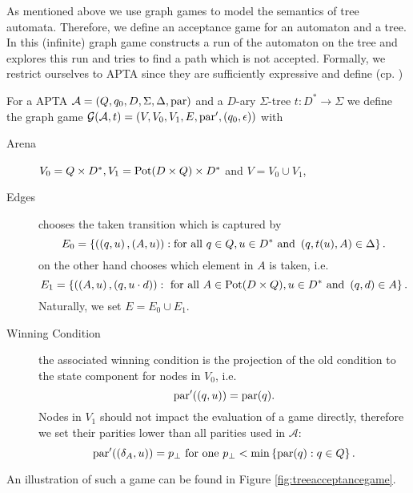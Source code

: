 As mentioned above we use graph games to model the semantics of tree automata.
Therefore, we define an acceptance game for an automaton and a tree. In this
(infinite) graph game \eve{} constructs a run of the automaton on the 
tree and \adam{} explores this run and tries to find a path which is not 
accepted. Formally, we restrict ourselves to \ac{APTA} since they are 
sufficiently expressive and define (cp. \cite{treeautosurvey,AltTreeAuto})
\begin{definition}
  For a \ac{APTA} $\mathcal{A} = \left(Q, q_{0}, D, \Sigma, \Delta, \operatorname{par}\right)$
  and a $D$-ary $\Sigma$-tree $t:D^{*}\rightarrow\Sigma$ we define the graph 
  game $\mathcal{G}(\mathcal{A}, t) = \left(V, V_{0}, V_{1}, E, 
  \operatorname{par}', \left(q_{0},\epsilon\right)\right)$ with
  \begin{description}
    \item [Arena] 
      $V_{0} = Q\times D^{*}, V_{1} = \operatorname{Pot}(D\times Q)\times D^{*}$ and
      $V = V_{0}\cup V_{1}$,
    \item [Edges]
      \eve{} chooses the taken transition which is captured by
      \begin{equation*}
        E_{0} = \left\{
          \left(\left(q, u\right),\left(A, u\right)\right):\text{for all }
          q\in Q,u\in D^{*}\text{ and }\left(q, t(u), A\right)\in\Delta
        \right\}.
      \end{equation*}
      \adam{} on the other hand chooses which element in $A$ is taken, i.e.
      \begin{equation*}
        E_{1} = \left\{
          \left(\left(A, u\right), \left(q, u\cdot d\right)\right):\text{ for all }
          A\in\operatorname{Pot}(D\times Q), u\in D^{*}\text{ and }\left(q,d\right)\in A
        \right\}.
      \end{equation*}
      Naturally, we set $E = E_{0}\cup E_{1}$.
    \item [Winning Condition]
      the associated winning condition is the projection of the old 
      condition to the state component for nodes in $V_{0}$, i.e.
      \begin{equation*}
        \operatorname{par}'(\left(q, u\right)) = \operatorname{par}(q).
      \end{equation*}
      Nodes in $V_{1}$ should not impact the evaluation of a game directly, 
      therefore we set their parities lower than all parities used in 
      $\mathcal{A}$:
      \begin{equation*}
        \operatorname{par}'(\left(\delta_{A}, u\right)) = p_{\bot}
        \text{ for one }p_{\bot} < \min\left\{\operatorname{par}(q):q\in Q\right\}.
      \end{equation*}
  \end{description}
  \label{def:treemembershipgame}
\end{definition}
An illustration of such a game can be found in Figure 
\ref{fig:treeacceptancegame}. 

